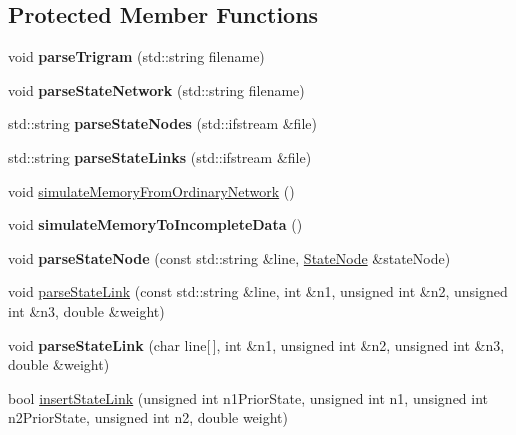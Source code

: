 \subsection*{Protected Member Functions}
\begin{DoxyCompactItemize}
\item 
\mbox{\label{classMemNetwork_a1b12cb9149ba117eff752f410d44f834}} 
void {\bfseries parse\+Trigram} (std\+::string filename)
\item 
\mbox{\label{classMemNetwork_ade763dd1db958471f3c85964e17cbf80}} 
void {\bfseries parse\+State\+Network} (std\+::string filename)
\item 
\mbox{\label{classMemNetwork_ae81d8cbf0f145c5686ed8943679cde39}} 
std\+::string {\bfseries parse\+State\+Nodes} (std\+::ifstream \&file)
\item 
\mbox{\label{classMemNetwork_a440df2398c40391ff5d6163f8817f261}} 
std\+::string {\bfseries parse\+State\+Links} (std\+::ifstream \&file)
\item 
void \mbox{\hyperlink{classMemNetwork_a2dd225189f5c53efd99bffacfc18bf7a}{simulate\+Memory\+From\+Ordinary\+Network}} ()
\item 
\mbox{\label{classMemNetwork_a0146d7f7b42ae6ea197d00a6e0acf90d}} 
void {\bfseries simulate\+Memory\+To\+Incomplete\+Data} ()
\item 
\mbox{\label{classMemNetwork_a6361b3a7bcd1ea6ece14a5bec4146977}} 
void {\bfseries parse\+State\+Node} (const std\+::string \&line, \mbox{\hyperlink{structStateNode}{State\+Node}} \&state\+Node)
\item 
void \mbox{\hyperlink{classMemNetwork_acb0405c84f7e3e436867da1673ea7611}{parse\+State\+Link}} (const std\+::string \&line, int \&n1, unsigned int \&n2, unsigned int \&n3, double \&weight)
\item 
\mbox{\label{classMemNetwork_afe668bf6cf827ba60f1f49c48d2f433a}} 
void {\bfseries parse\+State\+Link} (char line\mbox{[}$\,$\mbox{]}, int \&n1, unsigned int \&n2, unsigned int \&n3, double \&weight)
\item 
bool \mbox{\hyperlink{classMemNetwork_a57ed428085242fe3d0538a97f52f174d}{insert\+State\+Link}} (unsigned int n1\+Prior\+State, unsigned int n1, unsigned int n2\+Prior\+State, unsigned int n2, double weight)

\end{DoxyCompactItemize}

